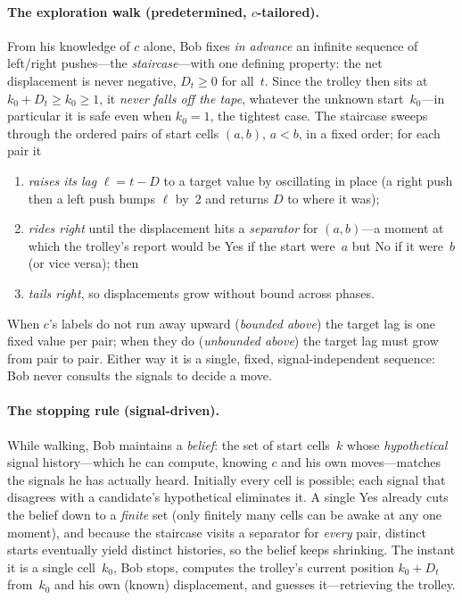 \documentclass{article}
\newcommand{\Yes}{\textsf{Yes}}
\newcommand{\No}{\textsf{No}}
\begin{document}
\paragraph{The exploration walk (predetermined, $c$-tailored).}
From his knowledge of $c$ alone, Bob fixes \emph{in advance} an infinite
sequence of left/right pushes---the \emph{staircase}---with one defining
property: the net displacement is never negative, $D_t\ge 0$ for all~$t$.
Since the trolley then sits at $k_0+D_t\ge k_0\ge 1$, it \emph{never falls
off the tape}, whatever the unknown start~$k_0$---in particular it is safe
even when $k_0=1$, the tightest case. The staircase sweeps through the
ordered pairs of start cells $(a,b)$, $a<b$, in a fixed order; for each
pair it
\begin{enumerate}[topsep=2pt,itemsep=1pt]
  \item \emph{raises its lag} $\ell=t-D$ to a target value by oscillating
  in place (a right push then a left push bumps $\ell$ by~$2$ and returns
  $D$ to where it was);
  \item \emph{rides right} until the displacement hits a \emph{separator}
  for $(a,b)$---a moment at which the trolley's report would be \Yes{} if
  the start were~$a$ but \No{} if it were~$b$ (or vice versa); then
  \item \emph{tails right}, so displacements grow without bound across
  phases.
\end{enumerate}
When $c$'s labels do not run away upward (\emph{bounded above}) the target
lag is one fixed value per pair; when they do (\emph{unbounded above}) the
target lag must grow from pair to pair. Either way it is a single, fixed,
signal-independent sequence: Bob never consults the signals to decide a
move.

\paragraph{The stopping rule (signal-driven).}
While walking, Bob maintains a \emph{belief}: the set of start cells~$k$
whose \emph{hypothetical} signal history---which he can compute, knowing
$c$ and his own moves---matches the signals he has actually heard.
Initially every cell is possible; each signal that disagrees with a
candidate's hypothetical eliminates it. A single \Yes{} already cuts the
belief down to a \emph{finite} set (only finitely many cells can be awake
at any one moment), and because the staircase visits a separator for
\emph{every} pair, distinct starts eventually yield distinct histories, so
the belief keeps shrinking. The instant it is a single cell~$k_0$, Bob
stops, computes the trolley's current position $k_0+D_t$ from~$k_0$ and his
own (known) displacement, and guesses it---retrieving the trolley.
\end{document}
